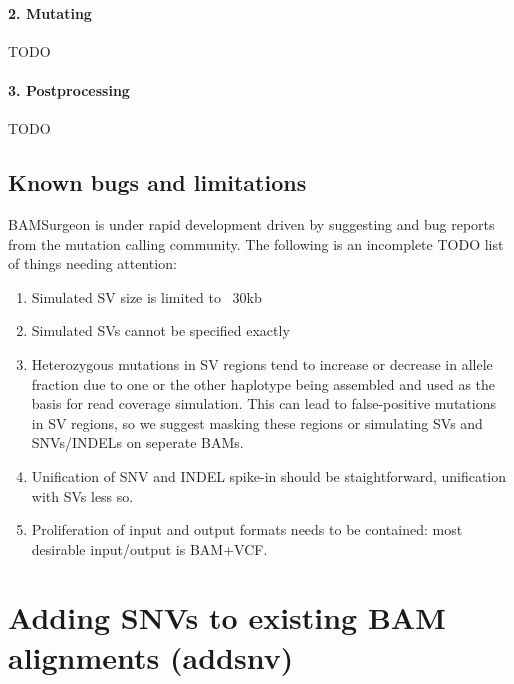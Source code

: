 \documentclass[letterpaper,11pt]{article}
\begin{document}
\paragraph{2. Mutating}
TODO

\paragraph{3. Postprocessing}
TODO

\subsection{Known bugs and limitations}
BAMSurgeon is under rapid development driven by suggesting and bug reports from the mutation calling community. The following is an incomplete TODO list of things needing attention:

\begin{enumerate}
\item Simulated SV size is limited to ~30kb
\item Simulated SVs cannot be specified exactly
\item Heterozygous mutations in SV regions tend to increase or decrease in allele fraction due to one or the other haplotype being assembled and used as the basis for read coverage simulation. This can lead to false-positive mutations in SV regions, so we suggest masking these regions or simulating SVs and SNVs/INDELs on seperate BAMs.
\item Unification of SNV and INDEL spike-in should be staightforward, unification with SVs less so.
\item Proliferation of input and output formats needs to be contained: most desirable input/output is BAM+VCF.
\end{enumerate}



\section{Adding SNVs to existing BAM alignments (addsnv)}
\end{document}
